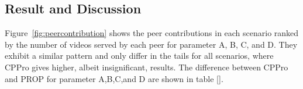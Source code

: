\documentclass[10pt,final,journal,a4paper]{IEEEtran}
\begin{document}









\subsection{Result and Discussion}\label{resultanddiscussion}

Figure~\ref{fig:peercontribution} shows the peer contributions in each scenario ranked by the number of videos served by each peer for parameter A, B, C, and D.
They exhibit a similar pattern and only differ in the tails for all scenarios, where CPPro gives higher, albeit insignificant, results.
The difference between CPPro and PROP for parameter A,B,C,and D are shown in table \ref{}.
\end{document}

